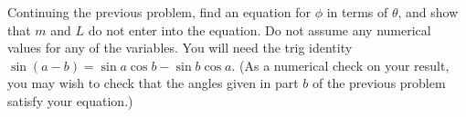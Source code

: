 Continuing the previous problem, find an equation for
$\phi $ in terms of $\theta $, and show that $m$ and $L$ do
not enter into the equation. Do not assume any numerical
values for any of the variables. You will need the trig
identity $\sin (a-b)=\sin a \cos b - \sin b \cos a$.
(As a numerical check on your result, you may wish to
check that the angles given in part $b$ of the previous
problem satisfy your equation.)
\answercheck
